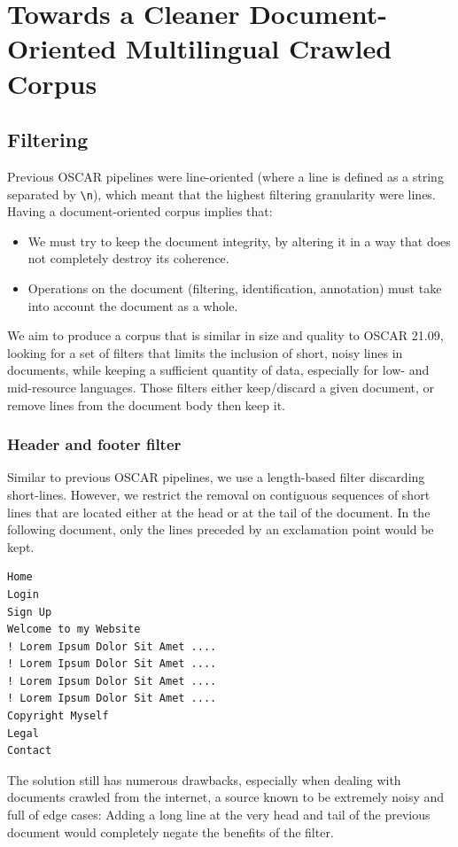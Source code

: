 \chapter{Towards a Cleaner Document-Oriented Multilingual Crawled Corpus}

\section{Filtering}

Previous OSCAR pipelines were line-oriented (where a line is defined as a string separated by \texttt{\textbackslash n}), which meant that the highest filtering granularity were lines.
Having a document-oriented corpus implies that:
\begin{itemize}
    \item We must try to keep the document integrity, by altering it in a way that does not completely destroy its coherence.
    \item Operations on the document (filtering, identification, annotation) must take into account the document as a whole.
\end{itemize}

We aim to produce a corpus that is similar in size and quality to OSCAR 21.09, looking for a set of filters that limits the inclusion of short, noisy lines in documents, while keeping a sufficient quantity of data, especially for low- and mid-resource languages. Those filters either keep/discard a given document, or remove lines from the document body then keep it.

\subsection {Header and footer filter}

Similar to previous OSCAR pipelines, we use a length-based filter discarding short-lines. However, we restrict the removal on contiguous sequences of short lines that are located either at the head or at the tail of the document. In the following document, only the lines preceded by an exclamation point would be kept.

\begin{verbatim}
Home
Login
Sign Up
Welcome to my Website
! Lorem Ipsum Dolor Sit Amet ....
! Lorem Ipsum Dolor Sit Amet ....
! Lorem Ipsum Dolor Sit Amet ....
! Lorem Ipsum Dolor Sit Amet ....
Copyright Myself
Legal
Contact
\end{verbatim}

The solution still has numerous drawbacks, especially when dealing with documents crawled from the internet, a source known to be extremely noisy and full of edge cases: Adding a long line at the very head and tail of the previous document would completely negate the benefits of the filter.

